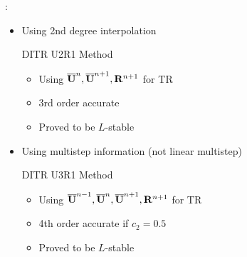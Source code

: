 \documentclass[aspectratio=169,serif]{beamer} %
\begin{document}
\begin{frame}{\secname: \subsecname}
  \begin{itemize}
    \small
    \item Using 2nd degree interpolation
          \begin{block}{DITR U2R1 Method}
            \begin{itemize}
              \item Using $\overline{\mathbf{U}}^{n},\overline{\mathbf{U}}^{n+1},\mathbf{R}^{n+1}$ for TR
              \item 3rd order accurate
              \item Proved to be $L$-stable
            \end{itemize}
          \end{block}
    \item Using multistep information (not linear multistep)
          \begin{block}{DITR U3R1 Method}
            \begin{itemize}
              \item Using $\overline{\mathbf{U}}^{n-1},\overline{\mathbf{U}}^{n},\overline{\mathbf{U}}^{n+1},\mathbf{R}^{n+1}$ for TR
              \item 4th order accurate if $c_2=0.5$
              \item Proved to be $L$-stable
            \end{itemize}
          \end{block}
  \end{itemize}
\end{frame}
\end{document}
